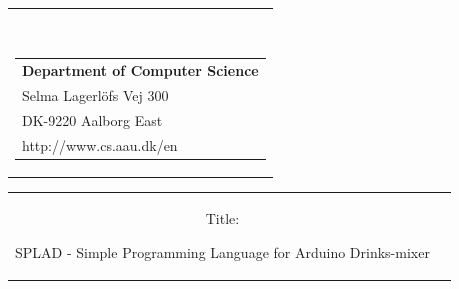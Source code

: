 


% 

\begin{nopagebreak}
{\samepage
\hspace{8cm}
\begin{tabular}{r}
\parbox{\textwidth}{  
\hfill
\\
\parbox{8cm}{\begin{tabular}{l}
{\small \textbf{Department of Computer Science}}\\
{\small Selma Lagerlöfs Vej 300} \\
{\small DK-9220 Aalborg East} \\
{\small http://www.cs.aau.dk/en}
\end{tabular}}}

\end{tabular}
\hspace{0cm}

\vspace{-5cm}
\begin{tabular}{cc}
\parbox{7cm}{
\begin{description}

\item {Title:} 

SPLAD - Simple Programming Language for Arduino Drinks-mixer


\end{description}}
\end{tabular}}
\end{nopagebreak}

